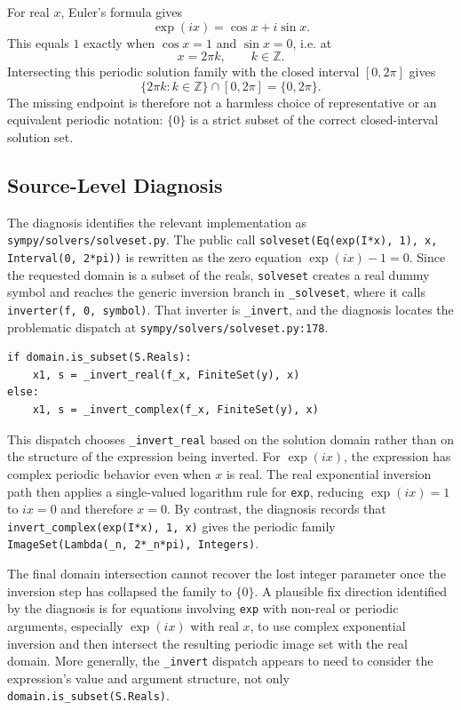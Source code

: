 \documentclass[11pt]{article}
\begin{document}
For real \(x\), Euler's formula gives
\[
    \exp(i x)=\cos x+i\sin x.
\]
This equals \(1\) exactly when \(\cos x=1\) and \(\sin x=0\), i.e. at
\[
    x=2\pi k,\qquad k\in\mathbb{Z}.
\]
Intersecting this periodic solution family with the closed interval
\([0,2\pi]\) gives
\[
    \{2\pi k:k\in\mathbb{Z}\}\cap[0,2\pi]=\{0,2\pi\}.
\]
The missing endpoint is therefore not a harmless choice of representative or an
equivalent periodic notation: \(\{0\}\) is a strict subset of the correct
closed-interval solution set.

\subsection{Source-Level Diagnosis}

\begin{sloppypar}
The diagnosis identifies the relevant implementation as
\nolinkurl{sympy/solvers/solveset.py}.  The public call
\texttt{solveset(Eq(exp(I*x), 1), x, Interval(0, 2*pi))} is rewritten as the
zero equation \(\exp(i x)-1=0\).  Since the requested domain is a subset of the
reals, \texttt{solveset} creates a real dummy symbol and reaches the generic
inversion branch in \texttt{\_solveset}, where it calls
\texttt{inverter(f, 0, symbol)}.  That inverter is \texttt{\_invert}, and the
diagnosis locates the problematic dispatch at
\nolinkurl{sympy/solvers/solveset.py:178}.
\end{sloppypar}

\begin{lstlisting}[style=bugpython]
if domain.is_subset(S.Reals):
    x1, s = _invert_real(f_x, FiniteSet(y), x)
else:
    x1, s = _invert_complex(f_x, FiniteSet(y), x)
\end{lstlisting}

This dispatch chooses \texttt{\_invert\_real} based on the solution domain
rather than on the structure of the expression being inverted.  For
\(\exp(i x)\), the expression has complex periodic behavior even when \(x\) is
real.  The real exponential inversion path then applies a single-valued
logarithm rule for \texttt{exp}, reducing \(\exp(i x)=1\) to \(i x=0\) and
therefore \(x=0\).  By contrast, the diagnosis records that
\texttt{invert\_complex(exp(I*x), 1, x)} gives the periodic family
\texttt{ImageSet(Lambda(\_n, 2*\_n*pi), Integers)}.

The final domain intersection cannot recover the lost integer parameter once
the inversion step has collapsed the family to \(\{0\}\).  A plausible fix
direction identified by the diagnosis is for equations involving \texttt{exp}
with non-real or periodic arguments, especially \(\exp(i x)\) with real \(x\),
to use complex exponential inversion and then intersect the resulting periodic
image set with the real domain.  More generally, the \texttt{\_invert}
dispatch appears to need to consider the expression's value and argument
structure, not only \texttt{domain.is\_subset(S.Reals)}.
\end{document}
